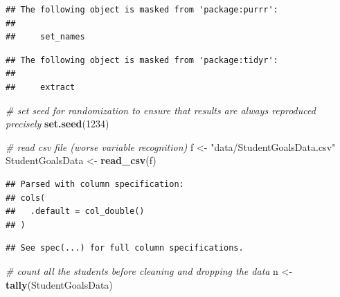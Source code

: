 \documentclass[]{article}
\newenvironment{Shaded}{\begin{snugshade}}{\end{snugshade}}
\newcommand{\CommentTok}[1]{\textcolor[rgb]{0.56,0.35,0.01}{\textit{#1}}}
\newcommand{\DecValTok}[1]{\textcolor[rgb]{0.00,0.00,0.81}{#1}}
\newcommand{\KeywordTok}[1]{\textcolor[rgb]{0.13,0.29,0.53}{\textbf{#1}}}
\newcommand{\NormalTok}[1]{#1}
\newcommand{\OperatorTok}[1]{\textcolor[rgb]{0.81,0.36,0.00}{\textbf{#1}}}
\newcommand{\StringTok}[1]{\textcolor[rgb]{0.31,0.60,0.02}{#1}}
\begin{document}
\begin{verbatim}
## The following object is masked from 'package:purrr':
## 
##     set_names
\end{verbatim}

\begin{verbatim}
## The following object is masked from 'package:tidyr':
## 
##     extract
\end{verbatim}

\begin{Shaded}
\begin{Highlighting}[]
\CommentTok{# set seed for randomization to ensure that results are always reproduced precisely}
\KeywordTok{set.seed}\NormalTok{(}\DecValTok{1234}\NormalTok{)}
\end{Highlighting}
\end{Shaded}

\begin{Shaded}
\begin{Highlighting}[]
\CommentTok{# read csv file (worse variable recognition)}
\NormalTok{f <-}\StringTok{ "data/StudentGoalsData.csv"}
\NormalTok{StudentGoalsData <-}\StringTok{ }\KeywordTok{read_csv}\NormalTok{(f)}
\end{Highlighting}
\end{Shaded}

\begin{verbatim}
## Parsed with column specification:
## cols(
##   .default = col_double()
## )
\end{verbatim}

\begin{verbatim}
## See spec(...) for full column specifications.
\end{verbatim}

\begin{Shaded}
\end{Shaded}

\begin{Shaded}
\begin{Highlighting}[]
\CommentTok{# count all the students before cleaning and dropping the data}
\NormalTok{n <-}\StringTok{ }\KeywordTok{tally}\NormalTok{(StudentGoalsData)}
\end{Highlighting}
\end{Shaded}
\end{document}
